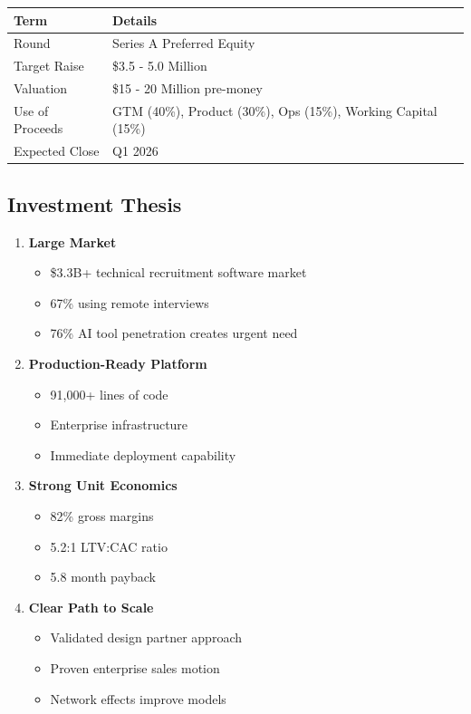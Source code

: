 \documentclass[11pt,letterpaper]{article}
\begin{document}
\begin{table}[H]
\centering
\begin{tabularx}{\textwidth}{lX}
\toprule
\textbf{Term} & \textbf{Details} \\
\midrule
Round & Series A Preferred Equity \\
Target Raise & \$3.5 - 5.0 Million \\
Valuation & \$15 - 20 Million pre-money \\
Use of Proceeds & GTM (40\%), Product (30\%), Ops (15\%), Working Capital (15\%) \\
Expected Close & Q1 2026 \\
\bottomrule
\end{tabularx}
\end{table}

\subsection{Investment Thesis}

\begin{enumerate}
    \item \textbf{Large Market}
    \begin{itemize}
        \item \$3.3B+ technical recruitment software market\cite{coherent2024}
        \item 67\% using remote interviews\cite{withe2024}
        \item 76\% AI tool penetration creates urgent need\cite{stackoverflow2024}
    \end{itemize}

    \item \textbf{Production-Ready Platform}
    \begin{itemize}
        \item 91,000+ lines of code
        \item Enterprise infrastructure
        \item Immediate deployment capability
    \end{itemize}

    \item \textbf{Strong Unit Economics}
    \begin{itemize}
        \item 82\% gross margins
        \item 5.2:1 LTV:CAC ratio
        \item 5.8 month payback
    \end{itemize}

    \item \textbf{Clear Path to Scale}
    \begin{itemize}
        \item Validated design partner approach
        \item Proven enterprise sales motion
        \item Network effects improve models
    \end{itemize}
\end{enumerate}
\end{document}
